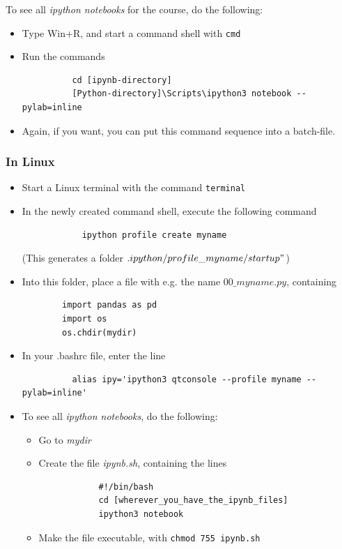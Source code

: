 To see all \emph{ipython notebooks} for the course, do the following:
\begin{itemize}
    \item Type Win+R, and start a command shell with \lstinline{cmd}
    \item Run the commands
        \begin{lstlisting}
          cd [ipynb-directory]
          [Python-directory]\Scripts\ipython3 notebook --pylab=inline
        \end{lstlisting}
    \item Again, if you want, you can put this command sequence into a batch-file.
\end{itemize}


\subsubsection{In Linux}

\begin{itemize}
  \item Start a Linux terminal with the command \lstinline{terminal}

  \item In the newly created command shell, execute the following command
        \begin{lstlisting}
            ipython profile create myname
        \end{lstlisting}
        (This generates a folder $.ipython/profile\_myname/startup"$)
  \item Into this folder, place a file with e.g. the name $00\_myname.py$, containing
        \begin{lstlisting}
        import pandas as pd
        import os
        os.chdir(mydir)
        \end{lstlisting}
  \item In your .bashrc file, enter the line
      \begin{lstlisting}
          alias ipy='ipython3 qtconsole --profile myname --pylab=inline'
      \end{lstlisting}
  \item To see all \emph{ipython notebooks}, do the following:
    \begin{itemize}
      \item Go to \emph{mydir}
      \item Create the file \emph{ipynb.sh}, containing the lines
        \begin{lstlisting}
            #!/bin/bash
            cd [wherever_you_have_the_ipynb_files]
            ipython3 notebook
        \end{lstlisting}
      \item Make the file executable, with \lstinline{chmod 755 ipynb.sh}
    \end{itemize}
\end{itemize}

